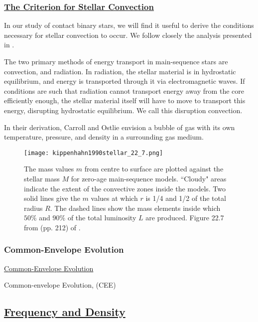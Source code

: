 \documentclass[12pt]{article} %
\numberwithin{equation}{section} %
\begin{document}
\subsubsection[The Criterion for Stellar Convection]{\hyperlink{toc}{The Criterion for Stellar Convection}} \label{sec: The Criterion for Stellar Convection}

In our study of contact binary stars, we will find it useful to derive the conditions necessary for stellar convection to occur. We follow closely the analysis presented in \citet{carroll2006introduction}.

The two primary methods of energy transport in main-sequence stars are convection, and radiation. In radiation, the stellar material is in hydrostatic equilibrium, and energy is transported through it via electromagnetic waves. If conditions are such that radiation cannot transport energy away from the core efficiently enough, the stellar material itself will have to move to transport this energy, disrupting hydrostatic equilibrium. We call this disruption convection. 

In their derivation, Carroll and Ostlie envision a bubble of gas with its own temperature, pressure, and density in a surrounding gas medium. 

\begin{figure}[H]
\centering
\texttt{[image: kippenhahn1990stellar\_22\_7.png]}
\caption{The mass values $m$ from centre to surface are plotted against the stellar mass $M$ for zero-age main-sequence models. ``Cloudy" areas indicate the extent of the convective zones inside the models. Two solid lines give the $m$ values at which $r$ is 1/4 and 1/2 of the total radius $R$. The dashed lines show the mass elements inside which $50\%$ and $90\%$ of the total luminosity $L$ are produced. Figure 22.7 from (pp. 212) of \citet{kippenhahn1990stellar}.}
\label{fig: kippenhahn1990stellar_22_7}
\end{figure}

\subsubsection{Common-Envelope Evolution}{\hyperlink{toc}{Common-Envelope Evolution}} \label{sec: Common-Envelope Evolution}

Common-envelope Evolution, (CEE) \citep{ivanova2013common}

\subsection[Frequency and Density]{\hyperlink{toc}{Frequency and Density}}
\end{document}

